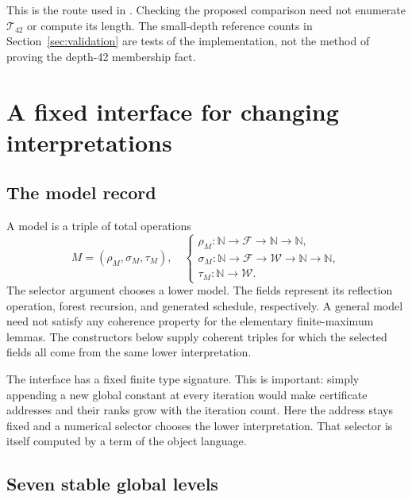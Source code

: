 \documentclass[11pt,letterpaper]{article}
\theoremstyle{definition}
\newcommand{\N}{\mathbb N}
\newcommand{\W}{\mathcal W}
\newcommand{\Fam}{\mathcal F}
\newcommand{\src}[1]{\texttt{\detokenize{#1}}}
\begin{document}
This is the route used in \src{Enumeration.lean}. Checking the proposed
comparison need not enumerate $\mathcal T_{42}$ or compute its length. The
small-depth reference counts in Section~\ref{sec:validation} are tests of the
implementation, not the method of proving the depth-42 membership fact.

\section{A fixed interface for changing interpretations}
\label{sec:interface}

\subsection{The model record}

A model is a triple of total operations
\begin{equation}\label{eq:model}
 M=(\rho_M,\sigma_M,\tau_M),
 \quad\begin{cases}
 \rho_M:\N\to\Fam\to\N\to\N,\\
 \sigma_M:\N\to\Fam\to\W\to\N\to\N,\\
 \tau_M:\N\to\W.
 \end{cases}
\end{equation}
The selector argument chooses a lower model. The fields represent its
reflection operation, forest recursion, and generated schedule, respectively.
A general model need not satisfy any coherence property for the elementary
finite-maximum lemmas. The constructors below supply coherent triples for
which the selected fields all come from the same lower interpretation.

The interface has a fixed finite type signature. This is important: simply
appending a new global constant at every iteration would make certificate
addresses and their ranks grow with the iteration count. Here the address
stays fixed and a numerical selector chooses the lower interpretation.
That selector is itself computed by a term of the object language.

\subsection{Seven stable global levels}
\end{document}
